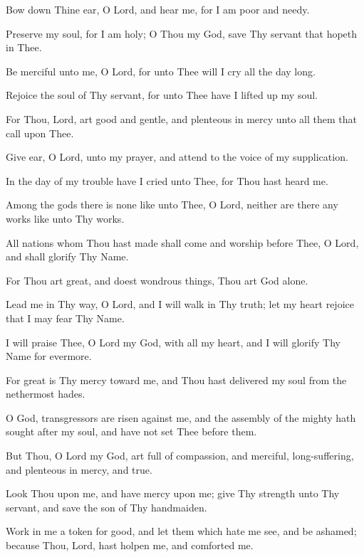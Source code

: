 Bow down Thine ear, O Lord, and hear me, for I am poor and needy.

Preserve my soul, for I am holy; O Thou my God, save Thy servant that hopeth in Thee.

Be merciful unto me, O Lord, for unto Thee will I cry all the day long.

Rejoice the soul of Thy servant, for unto Thee have I lifted up my soul.

For Thou, Lord, art good and gentle, and plenteous in mercy unto all them that call upon Thee.

Give ear, O Lord, unto my prayer, and attend to the voice of my supplication.

In the day of my trouble have I cried unto Thee, for Thou hast heard me.

Among the gods there is none like unto Thee, O Lord, neither are there any works like unto Thy works.

All nations whom Thou hast made shall come and worship before Thee, O Lord, and shall glorify Thy Name.

For Thou art great, and doest wondrous things, Thou art God alone.

Lead me in Thy way, O Lord, and I will walk in Thy truth; let my heart rejoice that I may fear Thy Name.

I will praise Thee, O Lord my God, with all my heart, and I will glorify Thy Name for evermore.

For great is Thy mercy toward me, and Thou hast delivered my soul from the nethermost hades.

O God, transgressors are risen against me, and the assembly of the mighty hath sought after my soul, and have not set Thee before them.

But Thou, O Lord my God, art full of compassion, and merciful, long-suffering, and plenteous in mercy, and true.

Look Thou upon me, and have mercy upon me; give Thy strength unto Thy servant, and save the son of Thy handmaiden.

Work in me a token for good, and let them which hate me see, and be ashamed; because Thou, Lord, hast holpen me, and comforted me.
